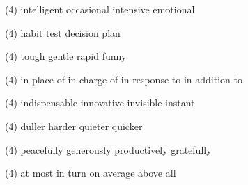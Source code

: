 \item
\begin{tasks}(4)
	\task intelligent
	\task occasional
	\task intensive
	\task emotional
\end{tasks}
\item
\begin{tasks}(4)
	\task habit
	\task test
	\task decision
	\task plan
\end{tasks}
\item
\begin{tasks}(4)
	\task tough
	\task gentle
	\task rapid
	\task funny
\end{tasks}
\item
\begin{tasks}(4)
	\task in place of
	\task in charge of
	\task in response to
	\task in addition to
\end{tasks}
\item
\begin{tasks}(4)
	\task indispensable
	\task innovative
	\task invisible
	\task instant
\end{tasks}
\item
\begin{tasks}(4)
	\task duller
	\task harder
	\task quieter
	\task quicker
\end{tasks}
\item
\begin{tasks}(4)
	\task peacefully
	\task generously
	\task productively
	\task gratefully
\end{tasks}
\item
\begin{tasks}(4)
	\task at most
	\task in turn
	\task on average
	\task above all
\end{tasks}
